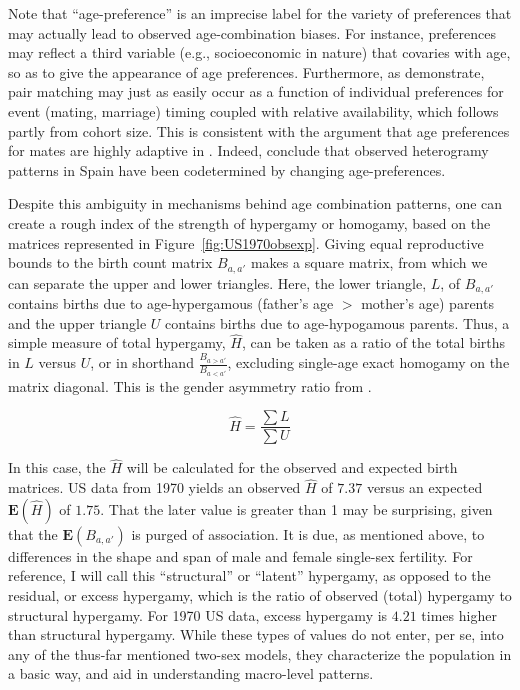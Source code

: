 Note that ``age-preference'' is an imprecise label for the variety
of preferences that may actually lead to observed age-combination biases. For
instance, preferences may reflect a third variable (e.g., socioeconomic
in nature) that covaries with age, so as to give
the appearance of age preferences. Furthermore, as \citet{bergstrom1994sweden}
demonstrate, pair matching may just as easily occur as a function of individual
preferences for event (mating, marriage) timing coupled with relative
availability, which follows partly from cohort size. This is consistent with the
argument that age preferences
for mates are highly adaptive in \citet{bhrolchain2001flexibility}. Indeed,
\citet{esteve2009long} conclude that observed heterogramy patterns in Spain have been codetermined by changing
age-preferences.

Despite this ambiguity in mechanisms behind age combination patterns, one can
create a rough index of the strength of hypergamy or homogamy, based on the
matrices represented in Figure~\ref{fig:US1970obsexp}. Giving equal reproductive
bounds to the birth count matrix $B_{a,a'}$ makes a square matrix, from which we
can separate the upper and lower triangles. Here, the lower triangle, $L$,
of $B_{a,a'}$ contains births due to age-hypergamous (father's age $>$ mother's
age) parents and the upper triangle $U$ contains births due to
age-hypogamous parents. Thus, a simple measure of total hypergamy, $\widehat{H}$, 
can be taken as a ratio of the total births in $L$ versus $U$, or in shorthand 
$\frac{B_{a>a'}}{B_{a<a'}}$, excluding single-age exact homogamy on the matrix
diagonal. This is the gender asymmetry ratio from \citet{esteve2009long}.

\begin{equation}
\widehat{H} = \frac{\sum L}{\sum U} 
\end{equation}

In this case, the $\widehat{H}$ will be calculated for the observed and expected
birth matrices. US data from 1970 yields an observed $\widehat{H}$ of $7.37$
versus an expected $\textbf{E}(\widehat{H})$ of $1.75$. That the later value is
greater than 1 may be surprising, given that the $\textbf{E}(B_{a,a'})$ is purged
of association. It is due, as mentioned above, to differences in the shape
and span of male and female single-sex fertility. For reference, I
will call this ``structural'' or ``latent'' hypergamy, as opposed to the
residual, or excess hypergamy, which is the ratio of observed (total) hypergamy to
structural hypergamy. For 1970 US data, excess hypergamy is $4.21$ times higher
than structural hypergamy. While these types of values do not enter, per se, 
into any of the thus-far mentioned two-sex models, they characterize the 
population in a basic way, and aid in understanding macro-level patterns. 

